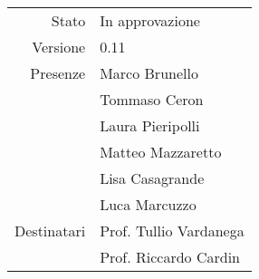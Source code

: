\begin{center}
\begin{tabular}{r|l}
	Stato & In approvazione \\
	Versione & 0.11 \\
	Presenze & Marco Brunello \\
	         & Tommaso Ceron \\
	         & Laura Pieripolli \\
	         & Matteo Mazzaretto \\
	         & Lisa Casagrande \\
	         & Luca Marcuzzo \\
	Destinatari & Prof. Tullio Vardanega \\
	            & Prof. Riccardo Cardin
\end{tabular}
\end{center}